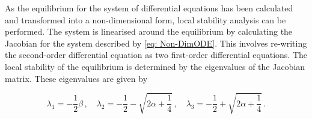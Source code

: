 





As the equilibrium for the system of differential equations has been calculated and transformed into a non-dimensional form, local stability analysis can be performed. The system is linearised around the equilibrium by calculating the Jacobian for the system described by \cref{eq: Non-DimODE}. This involves re-writing the second-order differential equation as two first-order differential equations. The local stability of the equilibrium is determined by the eigenvalues of the Jacobian matrix. These eigenvalues are given by

\begin{equation*}
\lambda_1 = - \frac{1}{2} \beta \, , \quad
\lambda_2 = - \frac{1}{2} - \sqrt{2 \alpha + \frac{1}{4}} \, , \quad \lambda_3 = - \frac{1}{2} + \sqrt{2 \alpha + \frac{1}{4}} \, .
\end{equation*}

